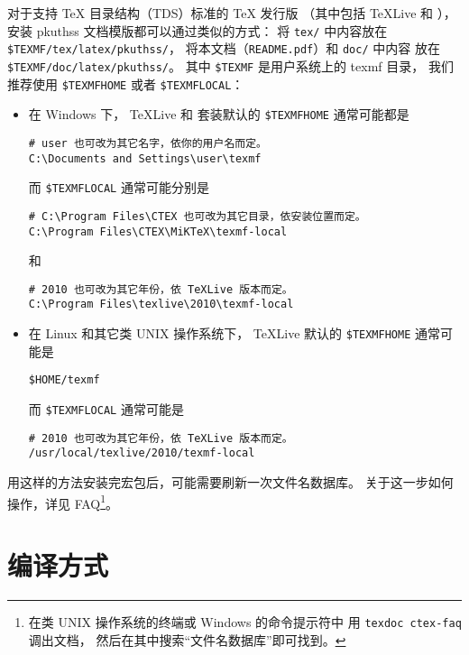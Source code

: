 	对于支持 \TeX{} 目录结构（TDS）标准的 \TeX{} 发行版%
	（其中包括 \TeX{}Live 和 \CTeX{}），
	安装 pkuthss 文档模版都可以通过类似的方式：
	将 \verb|tex/| 中内容放在 \verb|$TEXMF/tex/latex/pkuthss/|，
	将本文档（\verb|README.pdf|）和 \verb|doc/| 中内容%
	放在 \verb|$TEXMF/doc/latex/pkuthss/|。
	其中 \verb|$TEXMF| 是用户系统上的 texmf 目录，
	我们推荐使用 \verb|$TEXMFHOME| 或者 \verb|$TEXMFLOCAL|：
	\begin{itemize}
		\item 在 Windows 下，%
			\TeX{}Live 和 \CTeX{} 套装默认的 \verb|$TEXMFHOME| %
			通常可能都是
\begin{Verbatim}[frame = single]
# user 也可改为其它名字，依你的用户名而定。
C:\Documents and Settings\user\texmf
\end{Verbatim}
			而 \verb|$TEXMFLOCAL| 通常可能分别是
\begin{Verbatim}[frame = single]
# C:\Program Files\CTEX 也可改为其它目录，依安装位置而定。
C:\Program Files\CTEX\MiKTeX\texmf-local
\end{Verbatim}
			和
\begin{Verbatim}[frame = single]
# 2010 也可改为其它年份，依 TeXLive 版本而定。
C:\Program Files\texlive\2010\texmf-local
\end{Verbatim}
		\item 在 Linux 和其它类 UNIX 操作系统下，
			\TeX{}Live 默认的 \verb|$TEXMFHOME| 通常可能是
\begin{Verbatim}[frame = single]
$HOME/texmf
\end{Verbatim}
			而 \verb|$TEXMFLOCAL| 通常可能是
\begin{Verbatim}[frame = single]
# 2010 也可改为其它年份，依 TeXLive 版本而定。
/usr/local/texlive/2010/texmf-local
\end{Verbatim}
	\end{itemize}

	用这样的方法安装完宏包后，可能需要刷新一次文件名数据库。
	关于这一步如何操作，详见 \CTeX{} FAQ\cite{ctex-faq}\footnote{%
		在类 UNIX 操作系统的终端或 Windows 的命令提示符中%
		用 \texttt{texdoc ctex-faq} 调出文档，
		然后在其中搜索“文件名数据库”即可找到。%
	}。

	\section{编译方式}\label{sec:compile}

